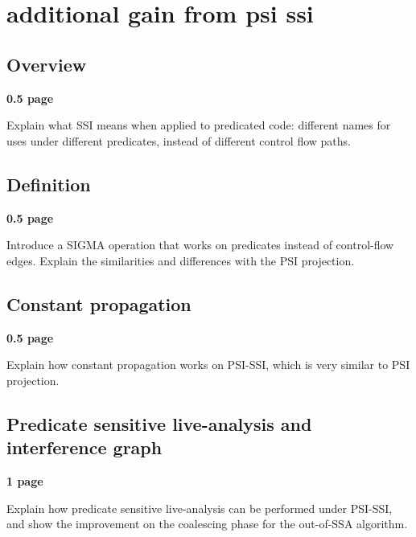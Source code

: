 \chapter{additional gain from psi ssi }




\section{Overview}

\textbf{0.5 page}

Explain what SSI means when applied to predicated code: different names for uses under different predicates, instead of different control flow paths.

\section{Definition}

\textbf{0.5 page}

Introduce a SIGMA operation that works on predicates instead of control-flow edges. Explain the similarities and differences with the PSI projection.

\section{Constant propagation}

\textbf{0.5 page}

Explain how constant propagation works on PSI-SSI, which is very similar to PSI projection.

\section{Predicate sensitive live-analysis and interference graph}

\textbf{1 page}

Explain how predicate sensitive live-analysis can be performed under PSI-SSI, and show the improvement on the coalescing phase for the out-of-SSA algorithm.

